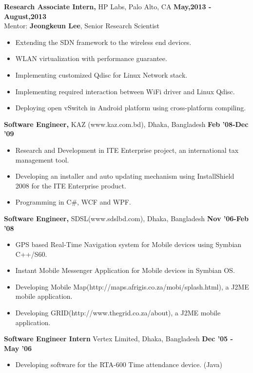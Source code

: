 \documentclass[margin]{res}
\begin{document}
\begin{resume}
{\bf Research Associate Intern,} HP Labs, Palo Alto, CA \hfill \textbf{May,2013 - August,2013} \\
Mentor: \textbf{Jeongkeun Lee}, Senior Research Scientist
\begin{itemize} \itemsep -2pt %
\item Extending the SDN framework to the wireless end devices.
\item WLAN virtualization with performance guarantee.
\item Implementing customized Qdisc for Linux Network stack.
\item Implementing required interaction between WiFi driver and Linux Qdisc. 
\item Deploying open vSwitch in Android platform using cross-platform compiling.
\end{itemize}

{\bf Software Engineer,} KAZ (www.kaz.com.bd), Dhaka, Bangladesh \hfill \textbf{Feb '08-Dec '09}
\begin{itemize} \itemsep -2pt
\item Research and Development in ITE Enterprise project, an international tax management tool. 
\item Developing an installer and auto updating mechanism using InstallShield 2008 for the ITE Enterprise product.
\item Programming in C\#, WCF and WPF.
\end{itemize}

{\bf Software Engineer,} SDSL(www.sdslbd.com), Dhaka, Bangladesh \hfill \textbf{Nov '06-Feb '08}
\begin{itemize} \itemsep -2pt
\item  GPS based Real-Time Navigation system for Mobile devices using Symbian C++/S60. 
\item  Instant Mobile Messenger Application for Mobile devices in Symbian OS.
\item  Developing Mobile Map(http://maps.afrigis.co.za/mobi/splash.html), a J2ME mobile application.
\item  Developing GRID(http://www.thegrid.co.za/about), a J2ME mobile application.
\end{itemize}

{\bf Software Engineer Intern} Vertex Limited, Dhaka, Bangladesh \hfill \textbf{Dec '05 - May '06}
\begin{itemize} \itemsep -2pt
\item  Developing software for the RTA-600 Time attendance device. (Java)
\end{itemize}



\end{resume}
\end{document}
